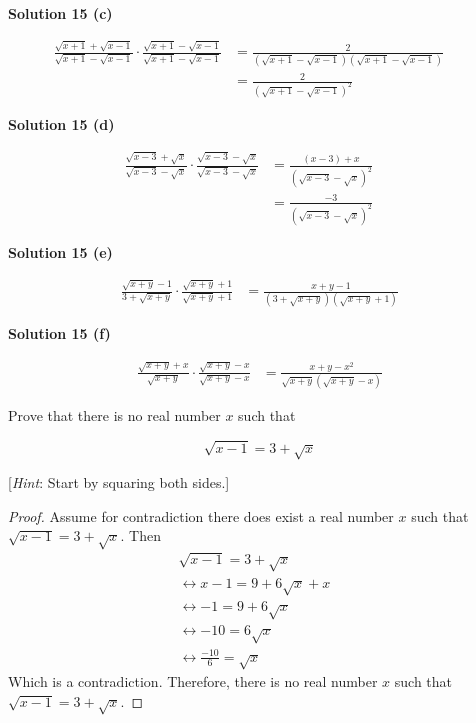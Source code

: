 \documentclass[6pt]{article}
\begin{document}
\textbf{Solution 15 (c)}

\begin{align*}
    \frac{\sqrt{x + 1} + \sqrt{x - 1}}{\sqrt{x + 1} - \sqrt{x - 1}} 
        \cdot \frac{\sqrt{x + 1} - \sqrt{x - 1}}{\sqrt{x + 1} - \sqrt{x - 1}}
    &= \frac{2}{(\sqrt{x + 1} - \sqrt{x - 1})(\sqrt{x + 1} - \sqrt{x - 1})} && \\
    &= \frac{2}{{(\sqrt{x + 1} - \sqrt{x - 1})}^2}
\end{align*}

\textbf{Solution 15 (d)}

\begin{align*}
    \frac{\sqrt{x - 3} + \sqrt{x}}{\sqrt{x - 3} - \sqrt{x}}
        \cdot \frac{\sqrt{x - 3} - \sqrt{x}}{\sqrt{x - 3} - \sqrt{x}} 
        &= \frac{(x - 3) + x}{{(\sqrt{x - 3} - \sqrt{x})}^2} && \\
        &= \frac{-3}{{(\sqrt{x - 3} - \sqrt{x})}^2}
\end{align*}

\textbf{Solution 15 (e)}

\begin{align*}
    \frac{\sqrt{x + y} - 1}{3 + \sqrt{x + y}}
        \cdot \frac{\sqrt{x + y} + 1}{\sqrt{x + y} + 1}
        &= \frac{x + y - 1}{(3 + \sqrt{x + y})(\sqrt{x + y} + 1)}
\end{align*}

\textbf{Solution 15 (f)}

\begin{align*}
    \frac{\sqrt{x + y} + x}{\sqrt{x + y}}
        \cdot \frac{\sqrt{x + y} - x}{\sqrt{x + y} - x}
        &= \frac{x + y - x^2}{\sqrt{x + y}(\sqrt{x + y} - x)}
\end{align*}

\begin{tcolorbox}[title=Problem 17, breakable]
    Prove that there is no real number $x$ such that 

    \[\sqrt{x - 1} = 3 + \sqrt{x}\]

    [\emph{Hint}: Start by squaring both sides.]
\end{tcolorbox}

\begin{proof}
    Assume for contradiction there does exist a real number $x$ such that $\sqrt{x - 1} = 3  + \sqrt{x}$.
    Then 
        \begin{align*}
            & \sqrt{x - 1} = 3 + \sqrt{x} && \\
            &\leftrightarrow x - 1 = 9 + 6\sqrt{x} + x && \\
            &\leftrightarrow -1 = 9 + 6\sqrt{x} && \\
            &\leftrightarrow -10 = 6\sqrt{x} && \\
            &\leftrightarrow \frac{-10}{6} = \sqrt{x}
        \end{align*}
    Which is a contradiction. Therefore, there is no real number $x$
    such that $\sqrt{x - 1} = 3 + \sqrt{x}$.
\end{proof}
\end{document}
